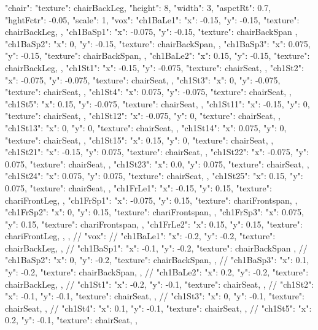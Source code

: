 {  "chair": {
    "texture": chairBackLeg,
    "height": 8,
    "width": 3,
    "aspctRt": 0.7,
    "hghtFctr": -0.05,
    "scale": 1,
    "vox": {
      "ch1BaLe1":{ "x": -0.15, "y": -0.15, "texture": chairBackLeg, },
      "ch1BaSp1":{ "x": -0.075, "y": -0.15, "texture": chairBackSpan },
      "ch1BaSp2":{ "x": 0,    "y": -0.15, "texture": chairBackSpan, },
      "ch1BaSp3":{ "x": 0.075,  "y": -0.15, "texture": chairBackSpan, },
      "ch1BaLe2":{ "x": 0.15,  "y": -0.15, "texture": chairBackLeg, },
      "ch1St1":{ "x": -0.15,   "y": -0.075, "texture": chairSeat, },
      "ch1St2":{ "x": -0.075,   "y": -0.075, "texture": chairSeat, },
      "ch1St3":{ "x": 0,      "y": -0.075, "texture": chairSeat, },
      "ch1St4":{ "x": 0.075,    "y": -0.075, "texture": chairSeat, },
      "ch1St5":{ "x": 0.15,    "y": -0.075, "texture": chairSeat, },
      "ch1St11":{ "x": -0.15,  "y": 0, "texture": chairSeat, },
      "ch1St12":{ "x": -0.075,  "y": 0, "texture": chairSeat, },
      "ch1St13":{ "x": 0,     "y": 0, "texture": chairSeat, },
      "ch1St14":{ "x": 0.075,   "y": 0, "texture": chairSeat, },
      "ch1St15":{ "x": 0.15,   "y": 0, "texture": chairSeat, },
      "ch1St21":{ "x": -0.15,  "y": 0.075, "texture": chairSeat, },
      "ch1St22":{ "x": -0.075,  "y": 0.075, "texture": chairSeat, },
      "ch1St23":{ "x": 0.0,   "y": 0.075, "texture": chairSeat, },
      "ch1St24":{ "x": 0.075,   "y": 0.075, "texture": chairSeat, },
      "ch1St25":{ "x": 0.15,   "y": 0.075, "texture": chairSeat, },
      "ch1FrLe1":{ "x": -0.15, "y": 0.15, "texture": chariFrontLeg, },
      "ch1FrSp1":{ "x": -0.075, "y": 0.15, "texture": chariFrontspan, },
      "ch1FrSp2":{ "x": 0,    "y": 0.15, "texture": chariFrontspan, },
      "ch1FrSp3":{ "x": 0.075,  "y": 0.15, "texture": chariFrontspan, },
      "ch1FrLe2":{ "x": 0.15,  "y": 0.15, "texture": chariFrontLeg, },
    },
    // "vox": {
    //   "ch1BaLe1":{ "x": -0.2, "y": -0.2, "texture": chairBackLeg, },
    //   "ch1BaSp1":{ "x": -0.1, "y": -0.2, "texture": chairBackSpan },
    //   "ch1BaSp2":{ "x": 0,    "y": -0.2, "texture": chairBackSpan, },
    //   "ch1BaSp3":{ "x": 0.1,  "y": -0.2, "texture": chairBackSpan, },
    //   "ch1BaLe2":{ "x": 0.2,  "y": -0.2, "texture": chairBackLeg, },
    //   "ch1St1":{ "x": -0.2,   "y": -0.1, "texture": chairSeat, },
    //   "ch1St2":{ "x": -0.1,   "y": -0.1, "texture": chairSeat, },
    //   "ch1St3":{ "x": 0,      "y": -0.1, "texture": chairSeat, },
    //   "ch1St4":{ "x": 0.1,    "y": -0.1, "texture": chairSeat, },
    //   "ch1St5":{ "x": 0.2,    "y": -0.1, "texture": chairSeat, },
}}}

